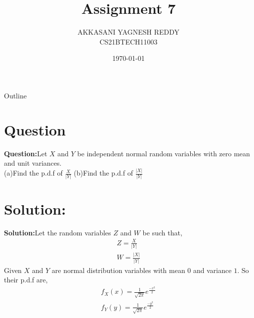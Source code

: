 \documentclass{beamer}
\title{Assignment 7}
\author{AKKASANI YAGNESH REDDY \\
     CS21BTECH11003 }
\date{\today}
\begin{document}
     \begin{frame}
     \maketitle    
     \end{frame}
     
     \logo{}
     
     \begin{frame}{Outline}
    \tableofcontents
     \end{frame}
     
     
     \section{Question}
     \begin{frame}
          \textbf{Question:}Let $X$ and $Y$ be independent normal random variables with zero mean and unit variances.\\
     (a)Find the p.d.f of $\frac{X}{|Y|}$
     (b)Find the p.d.f of $\frac{|X|}{|Y|}$
     \end{frame}
     
     \section{Solution:}
     \begin{frame}
\textbf{Solution:}Let the random variables $Z$ and $W$ be such that,
     \begin{align}
         Z=\frac{X}{|Y|}\\
         W=\frac{|X|}{|Y|}
          \end{align}
    Given $X$ and $Y$ are normal distribution variables with mean $0$ and variance $1$. So their p.d.f are,
    \begin{align}
        f_{X}(x)=\frac{1}{\sqrt{2\pi}}e^{\frac{-x^{2}}{2}}\\
        f_{Y}(y)=\frac{1}{\sqrt{2\pi}}e^{\frac{-y^{2}}{2}}
        \end{align}         
     \end{frame}
     
\end{document}
